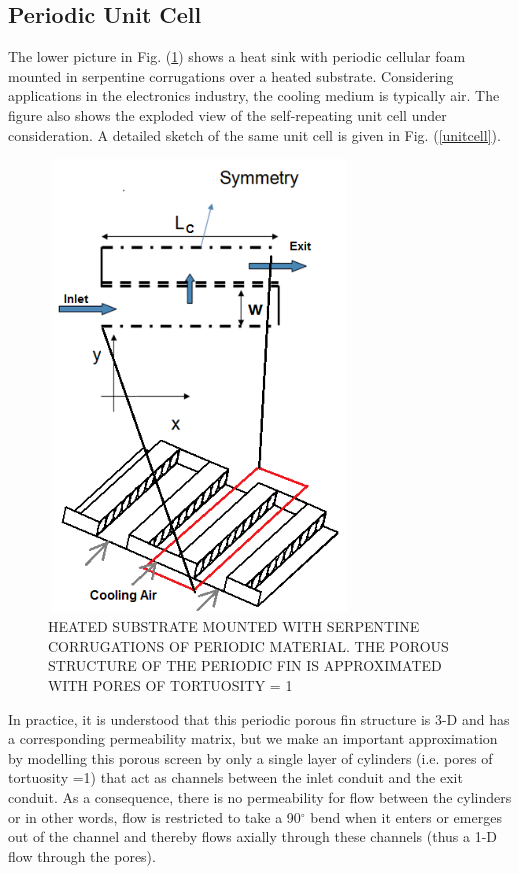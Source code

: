 \documentclass[twocolumn,10pt,cleanfoot]{ihmtc}
\begin{document}
\subsection{Periodic Unit Cell}\label{periodicunitcell}
The lower picture in Fig. (\ref{exploded}) shows a heat sink with periodic cellular foam mounted in serpentine corrugations over a heated substrate. Considering applications in the electronics industry, the cooling medium is typically air. The figure also shows the exploded view of the self-repeating unit cell under consideration. A detailed sketch of the same unit cell is given in Fig. (\ref{unitcell}).
%
\begin{figure}[ht]
\centerline{\includegraphics[width=80mm,height=120mm]{exploded_2.png}}
\vspace{-1.5ex}
\caption{\small{HEATED SUBSTRATE MOUNTED WITH SERPENTINE CORRUGATIONS OF PERIODIC MATERIAL. THE POROUS STRUCTURE OF THE PERIODIC FIN IS APPROXIMATED WITH PORES OF TORTUOSITY = 1}}
\label{exploded}
\end{figure}
%
In practice, it is understood that this periodic porous fin structure is 3-D and has a corresponding permeability matrix, but we make an important approximation by modelling this porous screen by only a single layer of cylinders (i.e. pores of tortuosity =1) that act as channels between the inlet conduit and the exit conduit. As a consequence, there is no permeability for flow between the cylinders or in other words, flow is restricted to take a 90$^\circ$ bend when it enters or emerges out of the channel and thereby flows axially through these channels (thus a 1-D flow through the pores).
\end{document}
